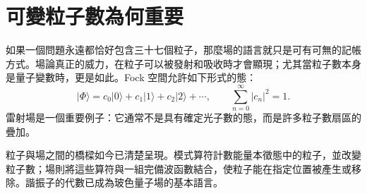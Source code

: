 \section{可變粒子數為何重要}

如果一個問題永遠都恰好包含三十七個粒子，那麼場的語言就只是可有可無的記帳方式。場論真正的威力，在粒子可以被發射和吸收時才會顯現；尤其當粒子數本身是量子變數時，更是如此。Fock 空間允許如下形式的態：
\begin{equation}
|\Phi\rangle
=c_0|0\rangle+c_1|1\rangle+c_2|2\rangle+\cdots,
\qquad
\sum_{n=0}^{\infty}|c_n|^2=1.
\end{equation}
雷射場是一個重要例子：它通常不是具有確定光子數的態，而是許多粒子數扇區的疊加。

粒子與場之間的橋樑如今已清楚呈現。模式算符計數能量本徵態中的粒子，並改變粒子數；場則將這些算符與一組完備波函數結合，使粒子能在指定位置被產生或移除。諧振子的代數已成為玻色量子場的基本語言。
